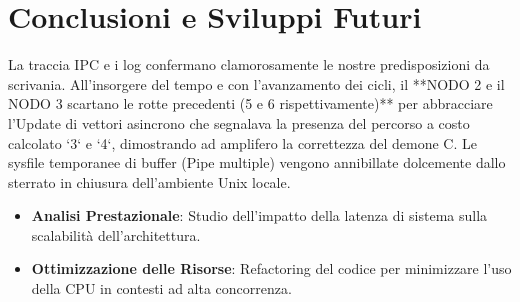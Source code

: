 \documentclass[a4paper,12pt]{article}
\begin{document}
\section{Conclusioni e Sviluppi Futuri}
La traccia IPC e i log confermano clamorosamente le nostre predisposizioni da scrivania. All'insorgere del tempo e con l'avanzamento dei cicli, il **NODO 2 e il NODO 3 scartano le rotte precedenti (5 e 6 rispettivamente)** per abbracciare l'Update di vettori asincrono che segnalava la presenza del percorso a costo calcolato `3` e `4`, dimostrando ad amplifero la correttezza del demone C. Le sysfile temporanee di buffer (Pipe multiple) vengono annibillate dolcemente dallo sterrato in chiusura dell'ambiente Unix locale.


\begin{itemize}
    \item \textbf{Analisi Prestazionale}: Studio dell'impatto della latenza di sistema sulla scalabilità dell'architettura.
    \item \textbf{Ottimizzazione delle Risorse}: Refactoring del codice per minimizzare l'uso della CPU in contesti ad alta concorrenza.
\end{itemize}
\end{document}

